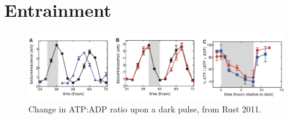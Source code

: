 \documentclass{article}
\begin{document}
\section*{Entrainment}

\begin{figure}
\begin{center}
\includegraphics[width=\textwidth]{adp_falling.png}
\caption{Change in ATP:ADP ratio upon a dark pulse, from Rust 2011.}
\end{center}
\end{figure}
\end{document}
